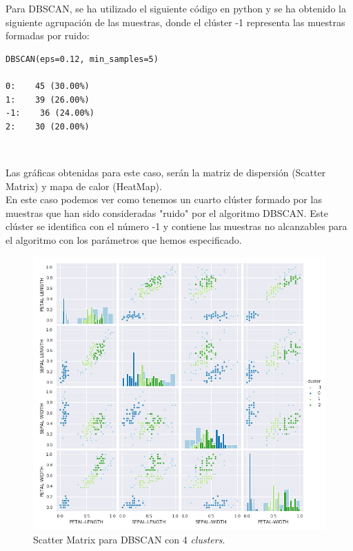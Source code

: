 \documentclass[a4paper, 20pt]{article}
\begin{document}
Para DBSCAN, se ha utilizado el siguiente código en python y se ha obtenido la siguiente agrupación de las muestras, donde el clúster -1 representa las muestras formadas por ruido:\\

\begin{lstlisting}
DBSCAN(eps=0.12, min_samples=5)

0:    45 (30.00%)
1:    39 (26.00%)
-1:    36 (24.00%)
2:    30 (20.00%)
\end{lstlisting}\

Las gráficas obtenidas para este caso, serán la matriz de dispersión (Scatter Matrix) y mapa de calor (HeatMap).\\

En este caso podemos ver como tenemos un cuarto clúster formado por las muestras que han sido consideradas "ruido" por el algoritmo DBSCAN. Este clúster se identifica con el número -1 y contiene las muestras no alcanzables para el algoritmo con los parámetros que hemos especificado.

\begin{figure}[h]
\centering
\includegraphics[scale=0.64]{dani/scatmatrixDBSCANIRIS.png}
\caption{Scatter Matrix para DBSCAN con 4 \textit{clusters}.}
\label{smdb}
\end{figure}

\clearpage
\end{document}
